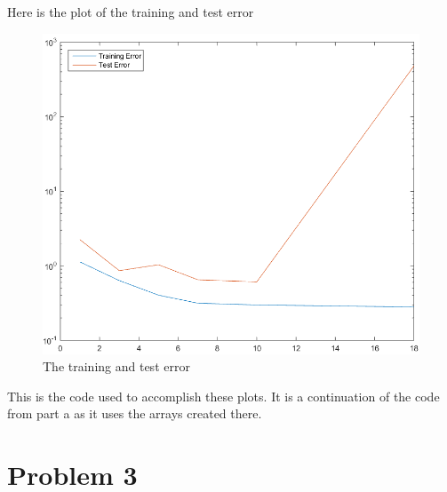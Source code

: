 \documentclass[twoside,11pt]{article}
\theoremstyle{definition}
\begin{document}
\newpage

Here is the plot of the training and test error
\begin{figure}[h]
\centering
\includegraphics[width=5 in]{prob1cPlotB.png}
\caption{The training and test error}
\end{figure}

\newpage

This is the code used to accomplish these plots. It is a continuation of the code from part a as it uses the arrays created there. 


\newpage

\section*{Problem 3}
\end{document}
